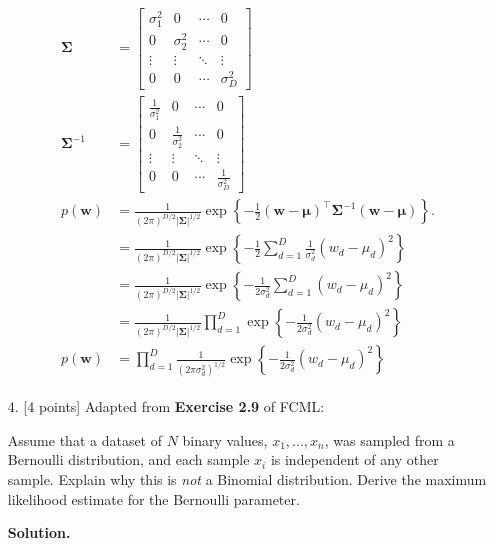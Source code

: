 \documentclass[10pt]{article}
\begin{document}
\begin{itemize}
\begin{eqnarray*}
\begin{aligned}
\mathbf{\Sigma} &= 
\begin{bmatrix}
\sigma_1^2 & 0 & \cdots & 0 \\
0 & \sigma_2^2 & \cdots & 0 \\
\vdots & \vdots & \ddots & \vdots \\
0 & 0 & \cdots & \sigma_D^2
\end{bmatrix}
\\
\mathbf{\Sigma}^{-1} &= 
\begin{bmatrix}
\frac{1}{\sigma_1^2} & 0 & \cdots & 0 \\
0 & \frac{1}{\sigma_2^2} & \cdots & 0 \\
\vdots & \vdots & \ddots & \vdots \\
0 & 0 & \cdots & \frac{1}{\sigma_D^2}
\end{bmatrix}
\\
p(\mathbf{w}) &= \frac{1}{(2 \pi)^{D/2} | \mathbf{\Sigma} |^{1/2}} \exp \left\{ -\frac{1}{2} (\mathbf{w} - \boldsymbol{\mu})^\top \mathbf{\Sigma}^{-1} (\mathbf{w} - \boldsymbol{\mu}) \right\} . \label{eqn:multnormal}
\\
&= \frac{1}{(2 \pi)^{D/2} | \mathbf{\Sigma} |^{1/2}} \exp 
\left\{ 
-\frac{1}{2} 
\sum_{d=1}^D 
\frac{1}{\sigma^2_d} (w_d - \mu_d)^2
\right\} 
\\
&= \frac{1}{(2 \pi)^{D/2} | \mathbf{\Sigma} |^{1/2}} \exp 
\left\{ 
-\frac{1}{2\sigma^2_d}
\sum_{d=1}^D 
(w_d - \mu_d)^2
\right\} 
\\
&= \frac{1}{(2 \pi)^{D/2} | \mathbf{\Sigma} |^{1/2}} 
\prod_{d=1}^D
\exp 
\left\{ 
-\frac{1}{2\sigma^2_d} 
(w_d - \mu_d)^2
\right\} 
\\
p(\mathbf{w}) &= 
\prod_{d=1}^D
\frac{1}{(2 \pi \sigma^2_d)^{1/2}}
\exp 
\left\{ 
-\frac{1}{2\sigma^2_d} 
(w_d - \mu_d)^2
\right\} 
\end{aligned}
\end{eqnarray*}


\item[4.] [4 points]
Adapted from {\bf Exercise 2.9} of FCML:

Assume that a dataset of $N$ binary values, $x_1, ..., x_n$, was sampled from a Bernoulli distribution, and each sample $x_i$ is independent of any other sample.  Explain why this is {\em not} a Binomial distribution.  Derive the maximum likelihood estimate for the Bernoulli parameter.

{\bf Solution.} 




\end{itemize}
\end{document}
